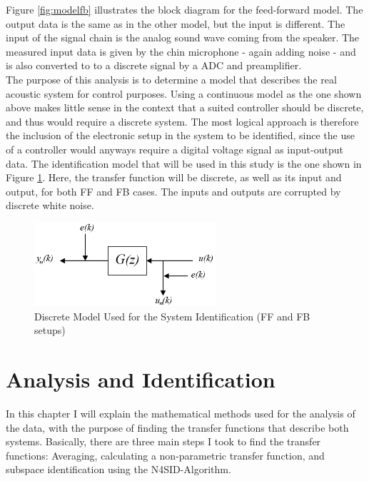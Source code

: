 Figure \ref{fig:modelfb} illustrates the block diagram for the feed-forward model. The output data is the same as in the other model, but the input is different. The input of the signal chain is the analog sound wave coming from the speaker. The measured input data is given by the chin microphone - again adding noise - and is also converted to to a discrete signal by a ADC and preamplifier.\\

The purpose of this analysis is to determine a model that describes the real acoustic system for control purposes. Using a continuous model as the one shown above makes little sense in the context that a suited controller should be discrete, and thus would require a discrete system. The most logical approach is therefore the inclusion of the electronic setup in the system to be identified, since the use of a controller would anyways require a digital voltage signal as input-output data. The identification model that will be used in this study is the one shown in Figure \ref{fig:modeldiscrete}. Here, the transfer function will be discrete, as well as its input and output, for both FF and FB cases. The inputs and outputs are corrupted by discrete white noise.

\begin{figure}[h]
\centering
\includegraphics[width=0.6\textwidth]{pics/discrete_model}
\caption{Discrete Model Used for the System Identification (FF and FB setups)}
\label{fig:modeldiscrete}
\end{figure}



\chapter{Analysis and Identification}\label{chap: analysisandid}

In this chapter I will explain the mathematical methods used for the analysis of the data, with the purpose of finding the transfer functions that describe both systems. Basically, there are three main steps I took to find the transfer functions: Averaging, calculating a non-parametric transfer function, and subspace identification using the N4SID-Algorithm.\\

